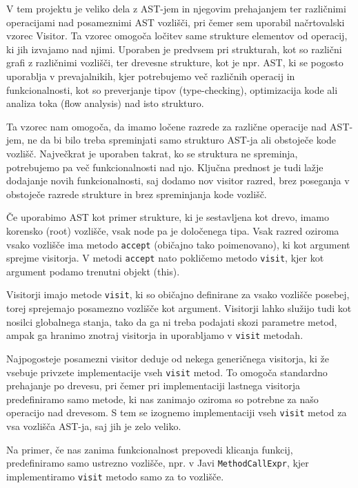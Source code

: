 \documentclass[a4paper,12pt,openright]{book}
\begin{document}
V tem projektu je veliko dela z AST-jem in njegovim prehajanjem ter različnimi operacijami nad posameznimi AST vozlišči, pri čemer sem uporabil načrtovalski vzorec Visitor. Ta vzorec omogoča ločitev same strukture elementov od operacij, ki jih izvajamo nad njimi. Uporaben je predvsem pri strukturah, kot so različni grafi z različnimi vozlišči, ter drevesne strukture, kot je npr. AST, ki se pogosto uporablja v prevajalnikih, kjer potrebujemo več različnih operacij in funkcionalnosti, kot so preverjanje tipov (type-checking), optimizacija kode ali analiza toka (flow analysis) nad isto strukturo.

Ta vzorec nam omogoča, da imamo ločene razrede za različne operacije nad AST-jem, ne da bi bilo treba spreminjati samo strukturo AST-ja ali obstoječe kode vozlišč. Največkrat je uporaben takrat, ko se struktura ne spreminja, potrebujemo pa več funkcionalnosti nad njo. Ključna prednost je tudi lažje dodajanje novih funkcionalnosti, saj dodamo nov visitor razred, brez poseganja v obstoječe razrede strukture in brez spreminjanja kode vozlišč.

Če uporabimo AST kot primer strukture, ki je sestavljena kot drevo, imamo korensko (root) vozlišče, vsak node pa je določenega tipa. Vsak razred oziroma vsako vozlišče ima metodo \texttt{accept} (običajno tako poimenovano), ki kot argument sprejme visitorja. V metodi \texttt{accept} nato pokličemo metodo \texttt{visit}, kjer kot argument podamo trenutni objekt (this).

Visitorji imajo metode \texttt{visit}, ki so običajno definirane za vsako vozlišče posebej, torej sprejemajo posamezno vozlišče kot argument. Visitorji lahko služijo tudi kot nosilci globalnega stanja, tako da ga ni treba podajati skozi parametre metod, ampak ga hranimo znotraj visitorja in uporabljamo v \texttt{visit} metodah.

Najpogosteje posamezni visitor deduje od nekega generičnega visitorja, ki že vsebuje privzete implementacije vseh \texttt{visit} metod. To omogoča standardno prehajanje po drevesu, pri čemer pri implementaciji lastnega visitorja predefiniramo samo metode, ki nas zanimajo oziroma so potrebne za našo operacijo nad drevesom. S tem se izognemo implementaciji vseh \texttt{visit} metod za vsa vozlišča AST-ja, saj jih je zelo veliko.

Na primer, če nas zanima funkcionalnost prepovedi klicanja funkcij, predefiniramo samo ustrezno vozlišče, npr. v Javi \texttt{MethodCallExpr}, kjer implementiramo \texttt{visit} metodo samo za to vozlišče.
\end{document}
